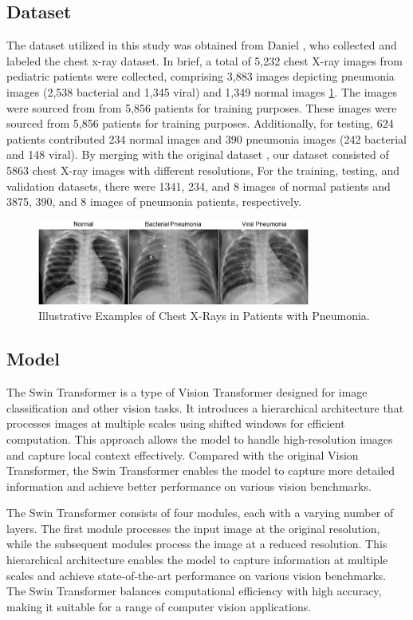\documentclass{article}
\begin{document}
\subsection{Dataset}
The dataset utilized in this study was obtained from Daniel \cite{KERMANY20181122}, who collected and labeled the chest x-ray dataset. In brief, a total of 5,232 chest X-ray images from pediatric patients were collected, comprising 3,883 images depicting pneumonia images (2,538 bacterial and 1,345 viral) and 1,349 normal images \ref{fig:chest}. The images were sourced from from 5,856 patients for training purposes. These images were sourced from 5,856 patients for training purposes. Additionally, for testing, 624 patients contributed 234 normal images and 390 pneumonia images (242 bacterial and 148 viral). By merging with the original dataset \cite{Kermany}, our dataset consisted of 5863 chest X-ray images with different resolutions, For the training, testing, and validation datasets, there were 1341, 234, and 8 images of normal patients and 3875, 390, and 8 images of pneumonia patients, respectively.

\begin{figure}[!htb]
  \centering
  \includegraphics[width=0.8\textwidth]{chest.jpg}
  \caption{Illustrative Examples of Chest X-Rays in Patients with Pneumonia.}
  \label{fig:chest}
\end{figure}

\subsection{Model}
The Swin Transformer is a type of Vision Transformer designed for image classification and other vision tasks. It introduces a hierarchical architecture that processes images at multiple scales using shifted windows for efficient computation. This approach allows the model to handle high-resolution images and capture local context effectively. Compared with the original Vision Transformer, the Swin Transformer enables the model to capture more detailed information and achieve better performance on various vision benchmarks.

The Swin Transformer consists of four modules, each with a varying number of layers. The first module processes the input image at the original resolution, while the subsequent modules process the image at a reduced resolution. This hierarchical architecture enables the model to capture information at multiple scales and achieve state-of-the-art performance on various vision benchmarks. The Swin Transformer balances computational efficiency with high accuracy, making it suitable for a range of computer vision applications.
\end{document}
